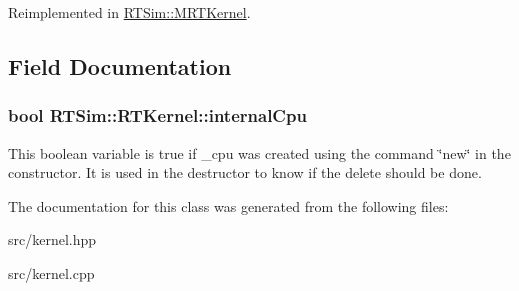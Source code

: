 Reimplemented in \hyperlink{classRTSim_1_1MRTKernel_a016ed93346f3505e11389cb8a8cdc777}{R\+T\+Sim\+::\+M\+R\+T\+Kernel}.



\subsection{Field Documentation}
\subsubsection[{\texorpdfstring{internal\+Cpu}{internalCpu}}]{\setlength{\rightskip}{0pt plus 5cm}bool R\+T\+Sim\+::\+R\+T\+Kernel\+::internal\+Cpu\hspace{0.3cm}{\ttfamily [protected]}}\hypertarget{classRTSim_1_1RTKernel_aff329e6c8a49b2d35274b65a5b6b348e}{}\label{classRTSim_1_1RTKernel_aff329e6c8a49b2d35274b65a5b6b348e}
This boolean variable is true if \+\_\+cpu was created using the command \char`\"{}new\char`\"{} in the constructor. It is used in the destructor to know if the delete should be done. 

The documentation for this class was generated from the following files\+:\begin{DoxyCompactItemize}
\item 
src/kernel.\+hpp\item 
src/kernel.\+cpp\end{DoxyCompactItemize}
